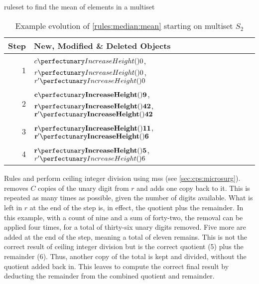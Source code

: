 \begin{cprulesetfloat}
\begin{cpruleset}




\end{cpruleset}
\caption{\label{rules:median:mean}\Gls{ruleset} to find the mean of elements in a multiset}
\end{cprulesetfloat}

\begin{table}[htbp]
\centering
  \begin{tabular}{|r|l|}
    \hline
    \textbf{Step} & \textbf{New, Modified \& Deleted Objects} \\ \hline
    1 & \(\cpfunc{c}{0}\), \(\cpfunc{r}{0}\), \(\cpfunc{r'}{0}\)\\ \hline
    2 & \(\mathbf{\cpfunc{c}{9}}\), \(\mathbf{\cpfunc{r}{42}}\), \(\mathbf{\cpfunc{r'}{42}}\)\\ \hline
    3 & \(\mathbf{\cpfunc{r}{11}}\), \(\mathbf{\cpfunc{r'}{6}}\)\\ \hline
    4 & \(\mathbf{\cpfunc{r}{5}}\), \sout{\(\cpfunc{r'}{6}\)}\\ \hline

\end{tabular}
\caption[Example evolution of \cref{rules:median:mean} to find the mean of elements in a multiset]{\label{tab:median:mean}Example evolution of \cref{rules:median:mean} starting on multiset \(S_2\)}
\end{table}

Rules  and  perform ceiling integer division using \glspl{ms} (see \vref{sec:cps:microsurg}).   removes \(C\) copies of the unary digit from \(r\) and adds one copy back to it.  This is repeated as many times as possible, given the number of digits available.  What is left in \(r\) at the end of the step is, in effect, the quotient plus the remainder.  In this example, with a count of nine and a sum of forty-two, the removal can be applied four times, for a total of thirty-six unary digits removed.  Five more are added at the end of the step, meaning a total of eleven remains.  This is not the correct result of ceiling integer division but is the correct quotient (5) plus the remainder (6).  Thus, another copy of the total is kept and divided, without the quotient added back in.  This leaves  to compute the correct final result by deducting the remainder from the combined quotient and remainder.

